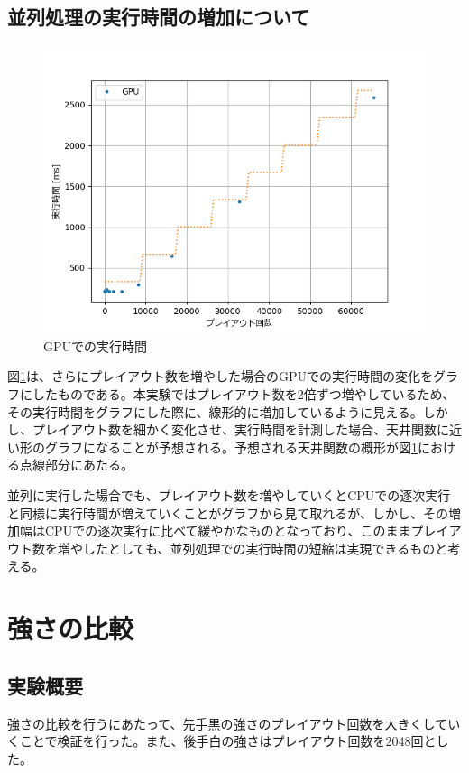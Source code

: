 \documentclass[10pt, a4paper]{jsarticle}
\begin{document}
\subsection{並列処理の実行時間の増加について}
\begin{figure}[ht]
    \begin{center}
        \includegraphics[width=12cm]{img/gpu_time_wCeil.png}
        \caption{GPUでの実行時間}
        \label{fig:gpu_time}
    \end{center}
\end{figure}
\par 図\ref{fig:gpu_time}は、さらにプレイアウト数を増やした場合のGPUでの実行時間の変化をグラフにしたものである。本実験ではプレイアウト数を2倍ずつ増やしているため、その実行時間をグラフにした際に、線形的に増加しているように見える。しかし、プレイアウト数を細かく変化させ、実行時間を計測した場合、天井関数に近い形のグラフになることが予想される。予想される天井関数の概形が図\ref{fig:gpu_time}における点線部分にあたる。
\par 並列に実行した場合でも、プレイアウト数を増やしていくとCPUでの逐次実行と同様に実行時間が増えていくことがグラフから見て取れるが、しかし、その増加幅はCPUでの逐次実行に比べて緩やかなものとなっており、このままプレイアウト数を増やしたとしても、並列処理での実行時間の短縮は実現できるものと考える。
\section{強さの比較}
\subsection{実験概要}
強さの比較を行うにあたって、先手黒の強さのプレイアウト回数を大きくしていくことで検証を行った。また、後手白の強さはプレイアウト回数を2048回とした。
\end{document}
